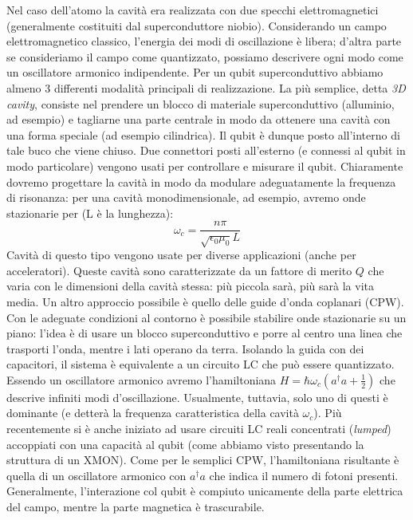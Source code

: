 Nel caso dell'atomo la cavità era realizzata con due specchi elettromagnetici (generalmente costituiti dal superconduttore niobio). 
Considerando un campo elettromagnetico classico, l'energia dei modi di oscillazione è libera; d'altra parte se consideriamo il campo come quantizzato, possiamo descrivere ogni modo come un oscillatore armonico indipendente.
Per un qubit superconduttivo abbiamo almeno 3 differenti modalità principali di realizzazione. La più semplice, detta \textit{3D cavity}, consiste nel prendere un blocco di materiale superconduttivo (alluminio, ad esempio) e tagliarne una parte centrale in modo da ottenere una cavità con una forma speciale (ad esempio cilindrica). Il qubit è dunque posto all'interno di tale buco che viene chiuso. Due connettori posti all'esterno (e connessi al qubit in modo particolare) vengono usati per controllare e misurare il qubit.
Chiaramente dovremo progettare la cavità in modo da modulare adeguatamente la frequenza di risonanza: per una cavità monodimensionale, ad esempio, avremo onde stazionarie per (L è la lunghezza):
\begin{equation*}
    \omega_c = \frac{n\pi}{\sqrt{\epsilon_0 \mu_0}L}
\end{equation*}
Cavità di questo tipo vengono usate per diverse applicazioni (anche per acceleratori).
Queste cavità sono caratterizzate da un fattore di merito $Q$ che varia con le dimensioni della cavità stessa: più piccola sarà, più sarà la vita media.
Un altro approccio possibile è quello delle guide d'onda coplanari (CPW). Con le adeguate condizioni al contorno è possibile stabilire onde stazionarie su un piano: l'idea è di usare un blocco superconduttivo e porre al centro una linea che trasporti l'onda, mentre i lati operano da terra. Isolando la guida con dei capacitori, il sistema è equivalente a un circuito LC che può essere quantizzato. Essendo un oscillatore armonico avremo l'hamiltoniana $H=\hbar\omega_c\left(a^\dagger a+\frac{1}{2}\right)$ che descrive infiniti modi d'oscillazione. Usualmente, tuttavia, solo uno di questi è dominante (e detterà la frequenza caratteristica della cavità $\omega_c$).
Più recentemente si è anche iniziato ad usare circuiti LC reali concentrati (\textit{lumped}) accoppiati con una capacità al qubit (come abbiamo visto presentando la struttura di un XMON). Come per le semplici CPW, l'hamiltoniana risultante è quella di un oscillatore armonico con $a^\dagger a$ che indica il numero di fotoni presenti. Generalmente, l'interazione col qubit è compiuto unicamente della parte elettrica del campo, mentre la parte magnetica è trascurabile.
